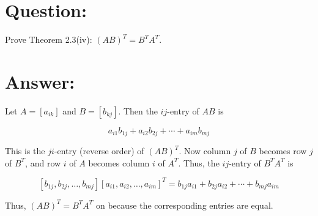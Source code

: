 \documentclass{article}
\begin{document}
\section{Question:}

Prove Theorem 2.3(iv): $(A B)^{T}=B^{T} A^{T}$.

\section{Answer:}

Let $A=\left[a_{i k}\right]$ and $B=\left[b_{k j}\right]$. Then the $i j$-entry of $A B$ is

$$
    a_{i 1} b_{1 j}+a_{i 2} b_{2 j}+\cdots+a_{i m} b_{m j}
$$

This is the $j i$-entry (reverse order) of $(A B)^{T}$. Now column $j$ of $B$ becomes row $j$ of $B^{T}$, and row $i$ of $A$ becomes column $i$ of $A^{T}$. Thus, the $i j$-entry of $B^{T} A^{T}$ is

$$
    \left[b_{1 j}, b_{2 j}, \ldots, b_{m j}\right]\left[a_{i 1}, a_{i 2}, \ldots, a_{i m}\right]^{T}=b_{1 j} a_{i 1}+b_{2 j} a_{i 2}+\cdots+b_{m j} a_{i m}
$$

Thus, $(A B)^{T}=B^{T} A^{T}$ on because the corresponding entries are equal.
\end{document}
